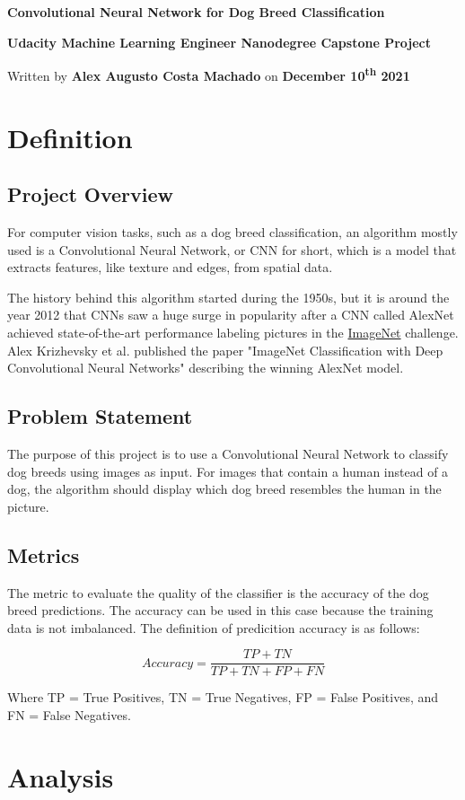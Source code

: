 \documentclass{article}
\newcommand{\doctitle}{Convolutional Neural Network for Dog Breed Classification}
\newcommand{\docsubtitle}{Udacity Machine Learning Engineer Nanodegree Capstone Project}
\newcommand{\docauthor}{Alex Augusto Costa Machado}
\newcommand{\docdate}{December 10\textsuperscript{th} 2021}
\newcommand{\docinfo}{
    \thispagestyle{empty}

    \begin{center}

        \Huge\textbf{\doctitle}
        \vspace{2mm}

        \LARGE\textbf{\docsubtitle}
        
        \vspace{3mm}
        \large
        Written by \textbf{\docauthor} on \textbf{\docdate}

    \end{center}
}
\begin{document}
    \docinfo

    \section{Definition}
    \subsection{Project Overview}

    For computer vision tasks, such as a dog breed classification, an algorithm mostly used is a Convolutional Neural Network, or CNN for short, which is a model that extracts features, like texture and edges, from spatial data.

    The history behind this algorithm started during the 1950s, but it is around the year 2012 that CNNs saw a huge surge in popularity after a CNN called AlexNet achieved state-of-the-art performance labeling pictures in the \href{https://image-net.org/}{ImageNet} challenge. Alex Krizhevsky et al. published the paper "ImageNet Classification with Deep Convolutional Neural Networks" describing the winning AlexNet model.

    \subsection{Problem Statement}

    The purpose of this project is to use a Convolutional Neural Network to classify dog breeds using images as input. For images that contain a human instead of a dog, the algorithm should display which dog breed resembles the human in the picture.

    \subsection{Metrics}

    The metric to evaluate the quality of the classifier is the accuracy of the dog breed predictions. The accuracy can be used in this case because the training data is not imbalanced. The definition of predicition accuracy is as follows:

    \[Accuracy = \frac{TP + TN}{TP +  TN + FP + FN} \]

    Where TP = True Positives, TN = True Negatives, FP = False Positives, and FN = False Negatives.

    \section{Analysis}
\end{document}
